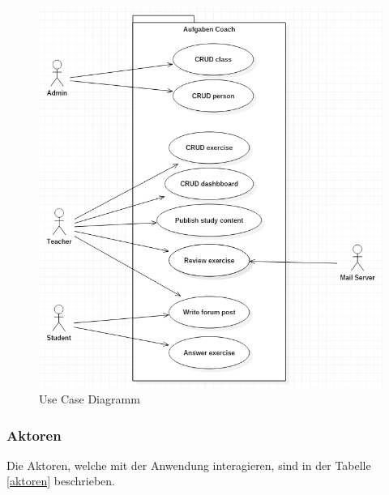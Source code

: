 \begin{minipage}{\textwidth}

\begin{figure}[H]
	\includegraphics[width=\textwidth, height=\textheight, keepaspectratio]{images/UseCaseDiagramm.png}
	\caption{Use Case Diagramm}
	\label{uc_diagram}
\end{figure}

\end{minipage}

\newpage

\subsubsection{Aktoren}
Die Aktoren, welche mit der Anwendung interagieren, sind in der Tabelle \ref{aktoren} beschrieben. \\

